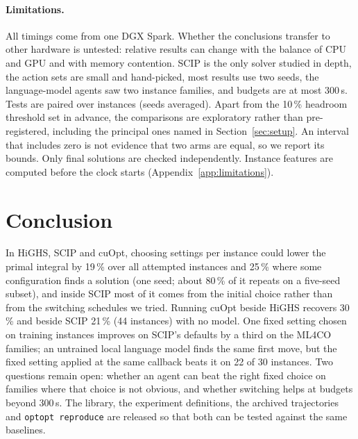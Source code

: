 \documentclass[11pt]{article}
\begin{document}
\paragraph{Limitations.} All timings come from one DGX Spark. Whether the conclusions transfer to other hardware is
untested: relative results can change with the balance of CPU and GPU and with memory contention. SCIP is the only solver studied in depth, the action sets are small and hand-picked, most results
use two seeds, the language-model agents saw two instance families, and budgets are at most 300\,s. Tests are paired
over instances (seeds averaged). Apart from the 10\,\% headroom threshold set in advance, the comparisons are
exploratory rather than pre-registered, including the principal ones named in Section~\ref{sec:setup}. An interval that includes zero
is not evidence that two arms are equal, so we report its bounds. Only final solutions are checked independently. Instance features are computed before the clock starts (Appendix~\ref{app:limitations}).

\section{Conclusion}
In HiGHS, SCIP and cuOpt, choosing settings per instance could lower the primal integral by 19\,\% over all attempted
instances and 25\,\% where some configuration finds a solution (one seed; about 80\,\% of it repeats on a five-seed
subset), and inside SCIP most of it comes from the initial choice rather than from the switching schedules we tried.
Running cuOpt beside HiGHS recovers 30\,\% and beside SCIP 21\,\% (44 instances) with no model. One fixed setting chosen on training instances
improves on SCIP's defaults by a third on the ML4CO families; an untrained local language model finds the same first
move, but the fixed setting applied at the same callback beats it on 22 of 30 instances. Two questions remain open:
whether an agent can beat the right fixed choice on families where that choice is not obvious, and whether switching
helps at budgets beyond 300\,s. The library, the experiment definitions, the archived trajectories and
\texttt{optopt reproduce} are released so that both can be tested against the same baselines.




\appendix

\end{document}
